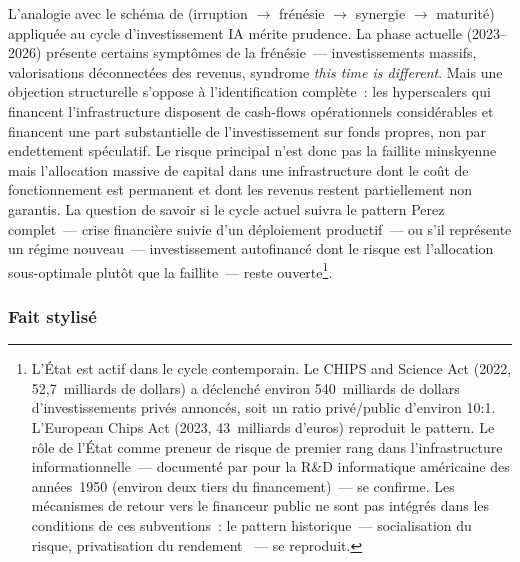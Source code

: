 L'analogie avec le schéma de \textcite{perez_technological_2002} (irruption $\rightarrow$ frénésie $\rightarrow$ synergie $\rightarrow$ maturité) appliquée au cycle d'investissement IA mérite prudence. La phase actuelle (2023--2026) présente certains symptômes de la frénésie~--- investissements massifs, valorisations déconnectées des revenus, syndrome \og \emph{this time is different}\fg{}. Mais une objection structurelle s'oppose à l'identification complète~: les hyperscalers qui financent l'infrastructure disposent de cash-flows opérationnels considérables et financent une part substantielle de l'investissement sur fonds propres, non par endettement spéculatif. Le risque principal n'est donc pas la faillite minskyenne mais l'allocation massive de capital dans une infrastructure dont le coût de fonctionnement est permanent et dont les revenus restent partiellement non garantis. La question de savoir si le cycle actuel suivra le pattern Perez complet~--- crise financière suivie d'un déploiement productif~--- ou s'il représente un régime nouveau~--- investissement autofinancé dont le risque est l'allocation sous-optimale plutôt que la faillite~--- reste ouverte\footnote{L'État est actif dans le cycle contemporain. Le CHIPS and Science Act (2022, 52,7~milliards de dollars) a déclenché environ 540~milliards de dollars d'investissements privés annoncés, soit un ratio privé/public d'environ 10:1. L'European Chips Act (2023, 43~milliards d'euros) reproduit le pattern. Le rôle de l'État comme preneur de risque de premier rang dans l'infrastructure informationnelle~--- documenté par \textcite{flamm_creating_1988} pour la R\&D informatique américaine des années~1950 (environ deux tiers du financement)~--- se confirme. Les mécanismes de retour vers le financeur public ne sont pas intégrés dans les conditions de ces subventions~: le pattern historique~--- socialisation du risque, privatisation du rendement \parencite{mazzucato_entrepreneurial_2013}~--- se reproduit.}.


\subsubsection{Fait stylisé}

